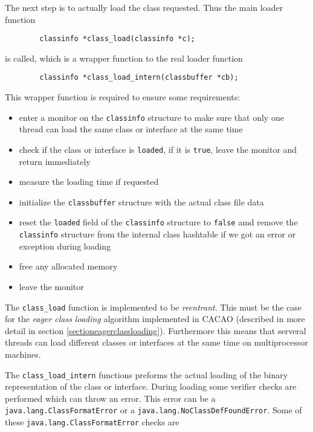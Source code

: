 The next step is to actually load the class requested. Thus the main
loader function

\begin{verbatim}
        classinfo *class_load(classinfo *c);
\end{verbatim}

is called, which is a wrapper function to the real loader function

\begin{verbatim}
        classinfo *class_load_intern(classbuffer *cb);
\end{verbatim}

This wrapper function is required to ensure some requirements:

\begin{itemize}
 \item enter a monitor on the \texttt{classinfo} structure to make
 sure that only one thread can load the same class or interface at the
 same time

 \item check if the class or interface is \texttt{loaded}, if it is
 \texttt{true}, leave the monitor and return immediately

 \item measure the loading time if requested

 \item initialize the \texttt{classbuffer} structure with the actual
 class file data

 \item reset the \texttt{loaded} field of the \texttt{classinfo}
 structure to \texttt{false} amd remove the \texttt{classinfo}
 structure from the internal class hashtable if we got an error or
 exception during loading

 \item free any allocated memory

 \item leave the monitor
\end{itemize}

The \texttt{class\_load} function is implemented to be
\textit{reentrant}. This must be the case for the \textit{eager class
loading} algorithm implemented in CACAO (described in more detail in
section \ref{sectioneagerclassloading}). Furthermore this means that
serveral threads can load different classes or interfaces at the same
time on multiprocessor machines.

The \texttt{class\_load\_intern} functions preforms the actual loading
of the binary representation of the class or interface. During loading
some verifier checks are performed which can throw an error. This
error can be a \texttt{java.lang.ClassFormatError} or a
\texttt{java.lang.NoClassDefFoundError}. Some of these
\texttt{java.lang.ClassFormatError} checks are

